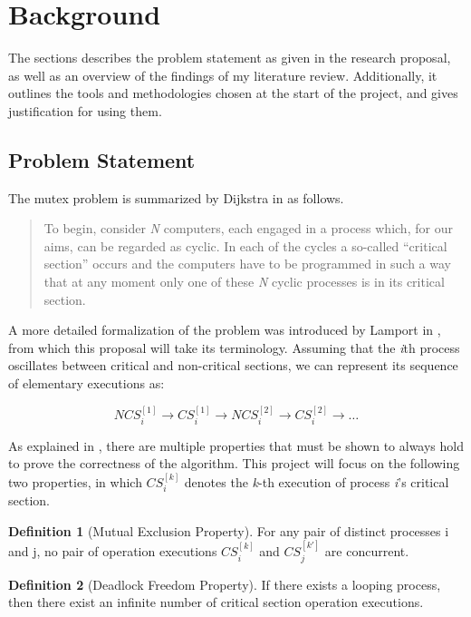 \documentclass{article}
\theoremstyle{definition}
\newtheorem{definition}{Definition}[section]
\begin{document}
\section{Background}
    The sections describes the problem statement as given in the research proposal, 
    as well as an overview of the findings of my literature review.
    Additionally, it outlines the tools and methodologies chosen at the start of the project,
    and gives justification for using them.

    \subsection{Problem Statement}
        The mutex problem is summarized by Dijkstra in \cite{dijkstra_solution_1965} as follows.

        \blockquote{
            To begin, consider \emph{N} computers, each engaged in a process which, for our aims, can be regarded as cyclic.
            In each of the cycles a so-called ``critical section'' occurs and the computers have to be programmed in such a way that at any moment only one of these \emph{N} cyclic processes is in its critical section.
        }

        \noindent 
        A more detailed formalization of the problem was introduced by Lamport in \cite{lamport_mutual_1986}, from which this proposal will take its terminology.
        Assuming that the \emph{i}th process oscillates between critical and non-critical sections, we can represent its sequence of elementary executions as:

        \[
            NCS_{i}^{[1]} \rightarrow CS_{i}^{[1]} \rightarrow NCS_{i}^{[2]} \rightarrow CS_{i}^{[2]} \rightarrow \ldots
        \]

        \noindent
        As explained in \cite{lamport_mutual_1986}, there are multiple properties that must be shown to always hold to prove the correctness of the algorithm.
        This project will focus on the following two properties, in which $CS_i^{[k]}$ denotes the \emph{k}-th execution of process \emph{i}'s critical section.


        \begin{definition}[Mutual Exclusion Property]
            For any pair of distinct processes i and j, no pair of operation executions $ CS_{i}^{[k]} $ and $ CS_{j}^{[k']} $ are concurrent.
        \end{definition}

        \begin{definition}[Deadlock Freedom Property]
            If there exists a looping process, then there exist an infinite number of critical section operation executions.
        \end{definition}
\end{document}
